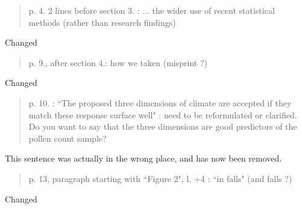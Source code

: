 \documentclass[a4paper,11pt]{article}
\begin{document}
\begin{framed} \begin{quote}
p. 4. 2 lines before section 3. :  ... the wider use of recent statistical methods (rather than research findings)
\end{quote} \end{framed}
Changed

\begin{framed} \begin{quote}
p. 9., after section 4.: how we taken (misprint ?)
\end{quote} \end{framed}
Changed

\begin{framed} \begin{quote}
p. 10. : ``The proposed three dimensions of climate are accepted if they match these response surface well" : need to be reformulated or clarified. Do you want to say that the three dimensions are good predictors of the pollen count sample? 
\end{quote} \end{framed}

This sentence was actually in the wrong place, and has now been removed.

\begin{framed} \begin{quote}
p. 13, paragraph starting with ``Figure 2", l. +4 : ``in falls" (and falls ?)
\end{quote} \end{framed}

Changed
\end{document}

